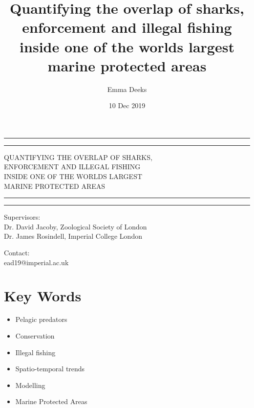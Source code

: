 \documentclass[11pt]{article}
\title {Quantifying the overlap of sharks, enforcement and illegal fishing inside one of the worlds largest marine protected areas}
\author{Emma Deeks}
\date{10 Dec 2019}
\begin{document}
	
	\begin{titlepage}
		
		
		\centering %
		
		
		
		
		\vspace*{5\baselineskip}
		
		\rule{\textwidth}{1.6pt}\vspace*{-\baselineskip}\vspace*{2pt} %
		\rule{\textwidth}{0.4pt} %
		
		\vspace{0.75\baselineskip} %
		
		{\LARGE QUANTIFYING THE OVERLAP OF SHARKS, \\ ENFORCEMENT AND ILLEGAL FISHING \\
			INSIDE ONE OF THE WORLDS LARGEST \\ MARINE PROTECTED AREAS \\} 
		
		\vspace{0.75\baselineskip} %
		
		\rule{\textwidth}{0.4pt}\vspace*{-\baselineskip}\vspace{3.2pt} 
		\rule{\textwidth}{1.6pt} 
		
		\vspace{2\baselineskip} 
		
		
		Supervisors: \\
		Dr. David Jacoby, Zoological Society of London \\ 
		Dr. James Rosindell, Imperial College London 
		
		
		
		\vspace{1.5 \baselineskip} %
		
		Contact: \\
		ead19@imperial.ac.uk
		
		\section{Key Words}
		\begin{itemize}
			
			\item Pelagic predators
			\item Conservation
			\item Illegal fishing
			\item Spatio-temporal trends
			\item Modelling 
			\item Marine Protected Areas
		\end{itemize}
		
	\end{titlepage}
	
\end{document}
